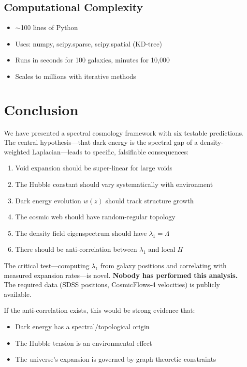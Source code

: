 \documentclass[11pt,a4paper]{article}
\theoremstyle{plain}
\theoremstyle{definition}
\theoremstyle{remark}
\begin{document}
\subsection{Computational Complexity}

\begin{itemize}[noitemsep]
    \item $\sim$100 lines of Python
    \item Uses: numpy, scipy.sparse, scipy.spatial (KD-tree)
    \item Runs in seconds for 100 galaxies, minutes for 10,000
    \item Scales to millions with iterative methods
\end{itemize}

\section{Conclusion}

We have presented a spectral cosmology framework with six testable predictions. The central hypothesis---that dark energy is the spectral gap of a density-weighted Laplacian---leads to specific, falsifiable consequences:

\begin{enumerate}[noitemsep]
    \item Void expansion should be super-linear for large voids
    \item The Hubble constant should vary systematically with environment
    \item Dark energy evolution $w(z)$ should track structure growth
    \item The cosmic web should have random-regular topology
    \item The density field eigenspectrum should have $\lambda_1 = \Lambda$
    \item There should be anti-correlation between $\lambda_1$ and local $H$
\end{enumerate}

The critical test---computing $\lambda_1$ from galaxy positions and correlating with measured expansion rates---is novel. \textbf{Nobody has performed this analysis.} The required data (SDSS positions, CosmicFlows-4 velocities) is publicly available.

If the anti-correlation exists, this would be strong evidence that:
\begin{itemize}[noitemsep]
    \item Dark energy has a spectral/topological origin
    \item The Hubble tension is an environmental effect
    \item The universe's expansion is governed by graph-theoretic constraints
\end{itemize}
\end{document}
